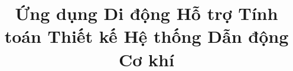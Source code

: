 \documentclass[twoside,final]{hcmut-report}
\title{\textbf{Ứng dụng Di động Hỗ trợ Tính toán Thiết kế Hệ thống Dẫn động Cơ khí}}
\begin{document}
\coverpage%

\tableofcontents
\listoffigures
\listoftables

\clearpage

\clearpage

\clearpage

\clearpage

\clearpage

\clearpage

\clearpage

\clearpage



\nocite{*}
\end{document}
